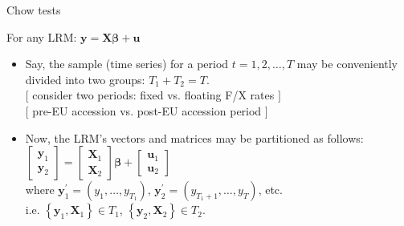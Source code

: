 \documentclass{beamer}
\begin{document}
\begin{frame}{Chow tests}

For any LRM: $\bm{y} = \bm{X\beta}+\bm{u}$
\vspace{0.3cm}

\begin{itemize}

\item Say, the sample (time series) for a period $t=1,2, \dots, T$ may be conveniently divided into two groups: $T_1 + T_2 = T$.  \\ 
$[$ consider two periods: fixed vs. floating F/X rates $]$ \\ 
$[$ pre-EU accession vs. post-EU accession period $]$
\vspace{0.3cm}
\item Now, the LRM's vectors and matrices may be partitioned as follows: \\
\vspace{0.3cm}
$ \begin{bmatrix} \bm{y}_1 \\ \bm{y}_2 \end{bmatrix} = 
\begin{bmatrix} \bm{X}_1 \\ \bm{X}_2 \end{bmatrix} \bm{\beta} +
\begin{bmatrix} \bm{u}_1 \\ \bm{u}_2 \end{bmatrix}$ \\
\vspace{0.2cm}
where $\bm{y}_1^\prime = (y_1, \dots , y_{T_1})$, 
$\bm{y}_2^\prime = (y_{T_1+1}, \dots , y_{T})$, etc. 
\\ i.e. $\left\lbrace\bm{y}_1, \bm{X}_1 \right\rbrace \in T_1$,  
$\left\lbrace\bm{y}_2, \bm{X}_2 \right\rbrace \in T_2$. 

\end{itemize}

\end{frame}



\end{document}
